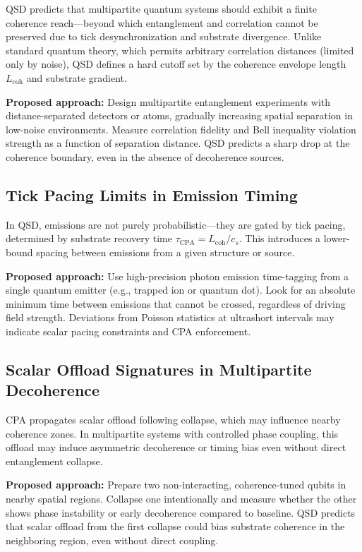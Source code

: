 \documentclass[preprints,article,submit,pdftex,moreauthors]{Definitions/mdpi}
\begin{document}
QSD predicts that multipartite quantum systems should exhibit a finite coherence reach—beyond which entanglement and correlation cannot be preserved due to tick desynchronization and substrate divergence. Unlike standard quantum theory, which permits arbitrary correlation distances (limited only by noise), QSD defines a hard cutoff set by the coherence envelope length \(L_{\text{coh}}\) and substrate gradient.

\textbf{Proposed approach:}  
Design multipartite entanglement experiments with distance-separated detectors or atoms, gradually increasing spatial separation in low-noise environments. Measure correlation fidelity and Bell inequality violation strength as a function of separation distance. QSD predicts a sharp drop at the coherence boundary, even in the absence of decoherence sources.

\subsection{Tick Pacing Limits in Emission Timing}

In QSD, emissions are not purely probabilistic—they are gated by tick pacing, determined by substrate recovery time \(\tau_{\text{CPA}} = L_{\text{coh}} / c_s\). This introduces a lower-bound spacing between emissions from a given structure or source.

\textbf{Proposed approach:}  
Use high-precision photon emission time-tagging from a single quantum emitter (e.g., trapped ion or quantum dot). Look for an absolute minimum time between emissions that cannot be crossed, regardless of driving field strength. Deviations from Poisson statistics at ultrashort intervals may indicate scalar pacing constraints and CPA enforcement.

\subsection{Scalar Offload Signatures in Multipartite Decoherence}

CPA propagates scalar offload following collapse, which may influence nearby coherence zones. In multipartite systems with controlled phase coupling, this offload may induce asymmetric decoherence or timing bias even without direct entanglement collapse.

\textbf{Proposed approach:}  
Prepare two non-interacting, coherence-tuned qubits in nearby spatial regions. Collapse one intentionally and measure whether the other shows phase instability or early decoherence compared to baseline. QSD predicts that scalar offload from the first collapse could bias substrate coherence in the neighboring region, even without direct coupling.
\end{document}
